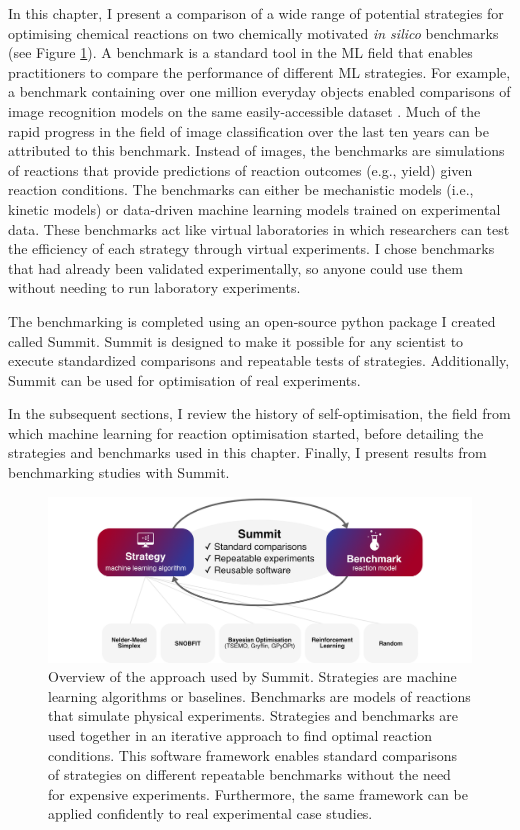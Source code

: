 In this chapter, I present a comparison of a wide range of potential strategies for optimising chemical reactions on two chemically motivated \emph{in silico} benchmarks (see Figure \ref{fig:overview}). A benchmark is a standard tool in the ML field that enables practitioners to compare the performance of different ML strategies. For example, a benchmark containing over one million everyday objects enabled comparisons of image recognition models on the same easily-accessible dataset \cite{Russakovsky2015}. Much of the rapid progress in the field of image classification over the last ten years can be attributed to this benchmark. Instead of images, the benchmarks are simulations of reactions that provide predictions of reaction outcomes (e.g., yield) given reaction conditions. The benchmarks can either be mechanistic models (i.e., kinetic models) or data-driven machine learning models trained on experimental data. These benchmarks act like virtual laboratories in which researchers can test the efficiency of each strategy through virtual experiments. I chose benchmarks that had already been validated experimentally, so anyone could use them without needing to run laboratory experiments. 

The benchmarking is completed using an open-source python package I created called Summit. Summit is designed to make it possible for any scientist to execute standardized comparisons and repeatable tests of strategies. Additionally, Summit can be used for optimisation of real experiments.

In the subsequent sections, I review the history of self-optimisation, the field from which machine learning for reaction optimisation started, before detailing the strategies and benchmarks used in this chapter. Finally, I present results from benchmarking studies with Summit.

\begin{figure}
    \centering
    \includegraphics[width=\textwidth]{gfx/Chapter03/overview.png}
    \caption{Overview of the approach used by Summit. Strategies are machine learning algorithms or baselines. Benchmarks are models of reactions that simulate physical experiments. Strategies and benchmarks are used together in an iterative approach to find optimal reaction conditions. This software framework enables standard comparisons of strategies on different repeatable benchmarks without the need for expensive experiments. Furthermore, the same framework can be applied confidently to real experimental case studies.}
    \label{fig:overview}
\end{figure}

